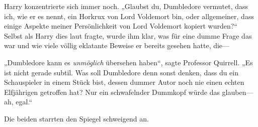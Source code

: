 Harry konzentrierte sich immer noch.
„Glaubst du, Dumbledore vermutet, dass ich, wie er es nennt, ein Horkrux von Lord Voldemort bin, oder allgemeiner, dass einige Aspekte meiner Persönlichkeit von Lord Voldemort kopiert wurden?“ Selbst als Harry dies laut fragte, wurde ihm klar, was für eine dumme Frage das war und wie viele völlig eklatante Beweise er bereits gesehen hatte, die—

„Dumbledore kann es \emph{unmöglich} übersehen haben“, sagte Professor Quirrell. „Es ist nicht gerade subtil. Was soll Dumbledore denn sonst denken, dass du ein Schauspieler in einem Stück bist, dessen dummer Autor noch nie einen echten Elfjährigen getroffen hat? Nur ein schwafelnder Dummkopf würde das glauben—ah, egal.“

Die beiden starrten den Spiegel schweigend an.

